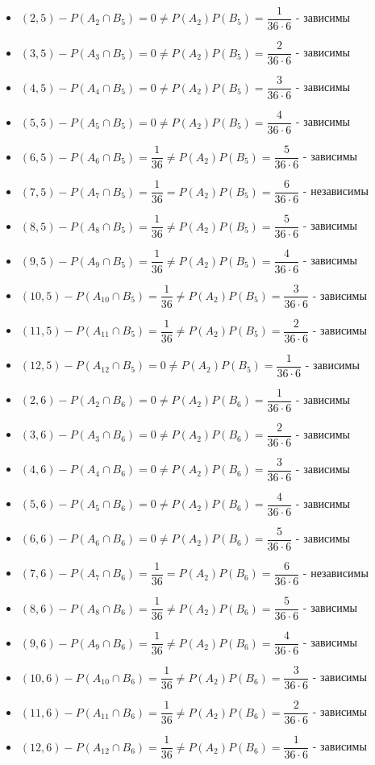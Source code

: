 \documentclass[a4paper,12pt]{article}
\begin{document}
\begin{itemize}
	\item \((2,5) -  P(A_2 \cap B_5) = 0 \neq P(A_2)P(B_5) = \dfrac{1}{36 \cdot 6} \) - зависимы
	\item \((3,5) -  P(A_3 \cap B_5) = 0 \neq P(A_2)P(B_5) = \dfrac{2}{36 \cdot 6} \) - зависимы
	\item \((4,5) -  P(A_4 \cap B_5) = 0 \neq P(A_2)P(B_5) = \dfrac{3}{36 \cdot 6} \) - зависимы
	\item \((5,5) -  P(A_5 \cap B_5) = 0 \neq P(A_2)P(B_5) = \dfrac{4}{36 \cdot 6} \) - зависимы
	\item \((6,5) -  P(A_6 \cap B_5) = \dfrac{1}{36} \neq P(A_2)P(B_5) = \dfrac{5}{36 \cdot 6} \) - зависимы
	\item \((7,5) -  P(A_7 \cap B_5) = \dfrac{1}{36} = P(A_2)P(B_5) = \dfrac{6}{36 \cdot 6} \) - независимы
	\item \((8,5) -  P(A_8 \cap B_5) = \dfrac{1}{36} \neq P(A_2)P(B_5) = \dfrac{5}{36 \cdot 6} \) - зависимы
	\item \((9,5) -  P(A_9 \cap B_5) = \dfrac{1}{36} \neq P(A_2)P(B_5) = \dfrac{4}{36 \cdot 6} \) - зависимы
	\item \((10,5) -  P(A_10 \cap B_5) = \dfrac{1}{36} \neq P(A_2)P(B_5) = \dfrac{3}{36 \cdot 6} \) - зависимы
	\item \((11,5) -  P(A_11 \cap B_5) = \dfrac{1}{36} \neq P(A_2)P(B_5) = \dfrac{2}{36 \cdot 6} \) - зависимы
	\item \((12,5) -  P(A_12 \cap B_5) = 0 \neq P(A_2)P(B_5) = \dfrac{1}{36 \cdot 6} \) - зависимы
\end{itemize}
\begin{itemize}
	\item \((2,6) -  P(A_2 \cap B_6) = 0 \neq P(A_2)P(B_6) = \dfrac{1}{36 \cdot 6} \) - зависимы
	\item \((3,6) -  P(A_3 \cap B_6) = 0 \neq P(A_2)P(B_6) = \dfrac{2}{36 \cdot 6} \) - зависимы
	\item \((4,6) -  P(A_4 \cap B_6) = 0 \neq P(A_2)P(B_6) = \dfrac{3}{36 \cdot 6} \) - зависимы
	\item \((5,6) -  P(A_5 \cap B_6) = 0 \neq P(A_2)P(B_6) = \dfrac{4}{36 \cdot 6} \) - зависимы
	\item \((6,6) -  P(A_6 \cap B_6) = 0 \neq P(A_2)P(B_6) = \dfrac{5}{36 \cdot 6} \) - зависимы
	\item \((7,6) -  P(A_7 \cap B_6) = \dfrac{1}{36} = P(A_2)P(B_6) = \dfrac{6}{36 \cdot 6} \) - независимы
	\item \((8,6) -  P(A_8 \cap B_6) = \dfrac{1}{36} \neq P(A_2)P(B_6) = \dfrac{5}{36 \cdot 6} \) - зависимы
	\item \((9,6) -  P(A_9 \cap B_6) = \dfrac{1}{36} \neq P(A_2)P(B_6) = \dfrac{4}{36 \cdot 6} \) - зависимы
	\item \((10,6) -  P(A_10 \cap B_6) = \dfrac{1}{36} \neq P(A_2)P(B_6) = \dfrac{3}{36 \cdot 6} \) - зависимы
	\item \((11,6) -  P(A_11 \cap B_6) = \dfrac{1}{36} \neq P(A_2)P(B_6) = \dfrac{2}{36 \cdot 6} \) - зависимы
	\item \((12,6) -  P(A_12 \cap B_6) = \dfrac{1}{36} \neq P(A_2)P(B_6) = \dfrac{1}{36 \cdot 6} \) - зависимы
\end{itemize}
\end{document}
